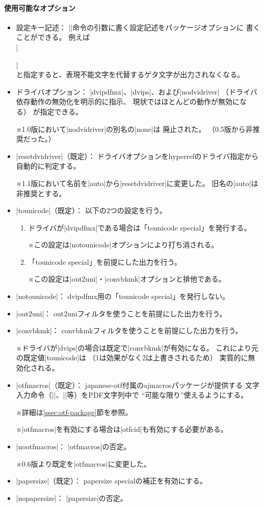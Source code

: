 \documentclass[uplatex,dvipdfmx,a4paper]{jsarticle}
\renewcommand{\headfont}{\gtfamily\romanseries{sbc}\sffamily}
\newcommand{\Pkg}[1]{\textsf{#1}}
\newcommand{\Note}{\par\noindent ※}
\newcommand{\Means}{：\quad}
\providecommand{\Strong}[1]{{\headfont#1}}
\begin{document}
\paragraph{使用可能なオプション}\mbox{}
\begin{itemize}
\item \Strong{設定キー記述}\Means
  |\pxjahypersetup|命令の引数に書く設定記述をパッケージオプションに
  書くことができる。
  例えば\\
  |\usepackage[fallback=delete]{pxjahyper}|\\
  と指定すると、表現不能文字を代替するゲタ文字が出力されなくなる。
\item \Strong{ドライバオプション}\Means
  |dvipdfmx|、|dvips|、および|nodvidriver|%
  （ドライバ依存動作の無効化を明示的に指示、
  現状ではほとんどの動作が無効になる）
  が指定できる。
  \Note 1.0版において|nodvidriver|の別名の|none|は
    \Strong{廃止}された。
    （0.5版から非推奨だった。）
\item |resetdvidriver|（既定）\Means
  ドライバオプションを\Pkg{hyperref}のドライバ指定から自動的に判定する。
  \Note 1.1版において名前を|auto|から|resetdvidriver|に変更した。
    旧名の|auto|は\Strong{非推奨}とする。
\item |tounicode|（既定）\Means
  以下の2つの設定を行う。
  \begin{enumerate}
  \item ドライバが|dvipdfmx|である場合は「tounicode special」を発行する。
    \Note この設定は|notounicode|オプションにより打ち消される。
  \item 「tounicode special」を前提にした出力を行う。
    \Note この設定は|out2uni|・|convbkmk|オプションと排他である。
  \end{enumerate}
\item |notounicode|\Means
  dvipdfmx用の「tounicode special」を発行しない。
\item |out2uni|\Means
  out2uniフィルタを使うことを前提にした出力を行う。
\item |convbkmk|\Means
  convbkmkフィルタを使うことを前提にした出力を行う。
  \Note ドライバが|dvips|の場合は既定で|convbkmk|が有効になる。
  これにより元の既定値|tounicode|は
  （1は効果がなく2は上書きされるため）
  実質的に無効化される。
\item |otfmacros|（既定）\Means
  \Pkg{japanese-otf}付属の\Pkg{ajmacros}パッケージが提供する
  文字入力命令（|\ajMaru|、|\ajLig|等）をPDF文字列中で
  “可能な限り”使えるようにする。
  \Note 詳細は\ref{ssec:otf-package}節を参照。
  \Note |otfmacros|を有効にする場合は|otfcid|も有効にする必要がある。
\item |nootfmacros|\Means
  |otfmacros|の否定。
  \Note 0.6版より既定を|otfmacros|に変更した。
\item |papersize|（既定）\Means
  papersize specialの補正を有効にする。
\item |nopapersize|\Means
  |papersize|の否定。
\end{itemize}
\end{document}

